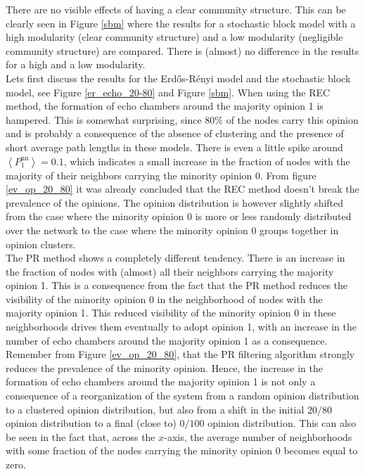 \documentclass[11 pt , letterpaper , twoside , openright]{book}
\begin{document}
There are no visible effects of having a clear community structure. This can be clearly seen in Figure \ref{sbm} where the results for a stochastic block model with a high modularity (clear community structure) and a low modularity (negligible community structure) are compared. There is (almost) no difference in the results for a high and a low modularity.\\
\newline
Lets first discuss the results for the Erd\H{o}s-R\'{e}nyi model and the stochastic block model, see Figure \ref{er_echo_20-80} and Figure \ref{sbm}. When using the REC method, the formation of echo chambers around the majority opinion 1 is hampered. This is somewhat surprising, since $80\%$ of the nodes carry this opinion and is probably a consequence of the absence of clustering and the presence of short average path lengths in these models. There is even a little spike around $\left<P_1^{\text{nn}}\right> = 0.1$, which indicates a small increase in the fraction of nodes with the majority of their neighbors carrying the minority opinion 0. From figure \ref{ev_op_20_80} it was already concluded that the REC method doesn't break the prevalence of the opinions. The opinion distribution is however slightly shifted from the case where the minority opinion 0 is more or less randomly distributed over the network to the case where the minority opinion 0 groups together in opinion clusters. \\
The PR method shows a completely different tendency. There is an increase in the fraction of nodes with (almost) all their neighbors carrying the majority opinion 1. This is a consequence from the fact that the PR method reduces the visibility of the minority opinion 0 in the neighborhood of nodes with the majority opinion 1. This reduced visibility of the minority opinion 0 in these neighborhoods drives them eventually to adopt opinion 1, with an increase in the number of echo chambers around the majority opinion 1 as a consequence. Remember from Figure \ref{ev_op_20_80}, that the PR filtering algorithm strongly reduces the prevalence of the minority opinion. Hence, the increase in the formation of echo chambers around the majority opinion 1 is not only a consequence of a reorganization of the system from a random opinion distribution to a clustered opinion distribution, but also from a shift in the initial $20/80$ opinion distribution to a final (close to) $0/100$ opinion distribution. This can also be seen in the fact that, across the $x$-axis, the average number of neighborhoods with some fraction of the nodes carrying the minority opinion 0 becomes equal to zero. \\
\end{document}

